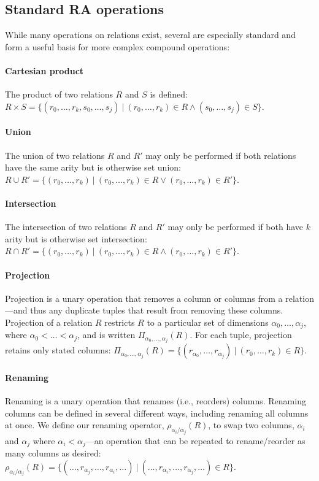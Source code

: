 \subsection{Standard RA operations}
\label{sec:ra:tc}
%
While many operations on relations exist, several are especially standard and form a useful basis for more complex compound operations:

\paragraph{Cartesian product} The product of two relations $R$ and $S$ is defined: $R \times S = \{ (r_0, \ldots, r_k, s_0, \ldots, s_j) \ |\ (r_0, \ldots, r_k) \in R \wedge (s_0, \ldots, s_j) \in S \}$.


\paragraph{Union} The union of two relations $R$ and $R'$ may only be performed if both relations have the same arity but is otherwise set union: $R \cup R' = \{ (r_0, \ldots, r_k) \ |\ (r_0, \ldots, r_k) \in R \vee (r_0, \ldots, r_k) \in R' \}$.


\paragraph{Intersection} The intersection of two relations $R$ and $R'$ may only be performed if both have $k$ arity but is otherwise set intersection: $R \cap R' = \{ (r_0, \ldots, r_k) \ |\ (r_0, \ldots, r_k) \in R \wedge (r_0, \ldots, r_k) \in R' \}$.


\paragraph{Projection} Projection is a unary operation that removes a column or columns from a relation---and thus any duplicate tuples that result from removing these columns. Projection of a relation $R$ restricts $R$ to a particular set of dimensions ${\alpha_0, \ldots, \alpha_j}$, where $\alpha_0 < \ldots < \alpha_j$, and is written $\Pi_{\alpha_0,\ldots,\alpha_j}(R)$. For each tuple, projection retains only stated columns: $\Pi_{\alpha_0,\ldots,\alpha_j}(R) = \{ (r_{\alpha_0}, \ldots, r_{\alpha_j}) \ |\  (r_0, \ldots, r_k) \in R \}$.


\paragraph{Renaming} Renaming is a unary operation that renames (i.e., reorders) columns. Renaming columns can be defined in several different ways, including renaming all columns at once. We define our renaming operator, $\rho_{\alpha_i / \alpha_j}(R)$, to swap two columns, $\alpha_i$ and $\alpha_j$ where $\alpha_i < \alpha_j$---an operation that can be repeated to rename/reorder as many columns as desired: \newline$\rho_{\alpha_i / \alpha_j}(R) = \{ (\ldots,r_{\alpha_j},\ldots,r_{\alpha_{i}},\ldots) \ |\ (\ldots,r_{\alpha_{i}},\ldots,r_{\alpha_{j}},\ldots) \in R \}$.


